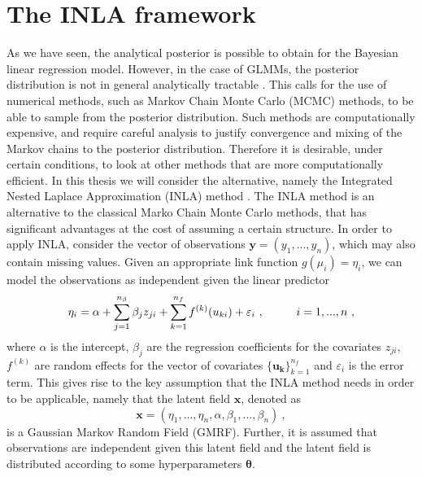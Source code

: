 \section{The INLA framework}
\label{sec:INLA_framework}
As we have seen, the analytical posterior is possible to obtain for the Bayesian linear regression model. However, in the case of GLMMs, the posterior distribution is not in general analytically tractable \citep{fong2010Bayesian}. This calls for the use of numerical methods, such as Markov Chain Monte Carlo (MCMC) methods, to be able to sample from the posterior distribution. 
Such methods are computationally expensive, and require careful analysis to justify convergence and mixing of the Markov chains to the posterior distribution. Therefore it is desirable, under certain conditions, to look at other methods that are more computationally efficient.
In this thesis we will consider the alternative, namely the Integrated Nested Laplace Approximation (INLA) method \citep{gomezrubio2020inla}.
\newline
\newline
The INLA method is an alternative to the classical Marko Chain Monte Carlo methods, that has significant advantages at the cost of assuming a certain structure.
In order to apply INLA, consider the vector of observations $\mathbf{y} = (y_1, ..., y_n)$, which may also contain missing values. 
Given an appropriate link function $g(\mu_i)=\eta_i$, we can model the observations as independent given the linear predictor
\begin{equation}
    \eta_i = \alpha + \sum_{j=1}^{n_{\beta}} \beta_j z_{ji} + \sum_{k=1}^{n_{f}} f^{(k)}(u_{ki}) + \varepsilon_i \ , \hspace{10mm} i=1, ..., n \ ,
\end{equation}
where $\alpha$ is the intercept, $\beta_j$ are the regression coefficients for the covariates $z_{ji}$, $f^{(k)}$ are random effects for the vector of covariates $\mathbf{\{u_{k}\}}_{k=1}^{n_f}$ and $\varepsilon_i$ is the error term.
This gives rise to the key assumption that the INLA method needs in order to be applicable, namely that the latent field $\mathbf{x}$, denoted as
\begin{equation}
    \mathbf{x} = (\eta_1, ..., \eta_n, \alpha, \beta_1, ..., \beta_{n}) \ ,
\end{equation}
is a Gaussian Markov Random Field (GMRF). Further, it is assumed that observations are independent given this latent field and the latent field is distributed according to some hyperparameters $\boldsymbol{\theta}$.
